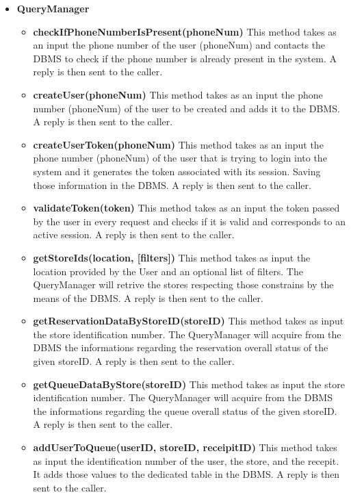 \begin{itemize}
    \item \textbf{QueryManager}
    \begin{itemize}
        \item \textbf{checkIfPhoneNumberIsPresent(phoneNum)}
        This method takes as an input the phone number of the user (phoneNum) and contacts the DBMS to check if the phone number is already present in the system. A reply is then sent to the caller.

        \item \textbf{createUser(phoneNum)}
        This method takes as an input the phone number (phoneNum) of the user to be created and adds it to the DBMS. A reply is then sent to the caller.

        \item \textbf{createUserToken(phoneNum)}
        This method takes as an input the phone number (phoneNum) of the user that is trying to login into the system and it generates the token associated with its session. Saving those information in the DBMS. A reply is then sent to the caller.

        \item \textbf{validateToken(token)}
        This method takes as an input the token passed by the user in every request and checks if it is valid and corresponds to an active session. A reply is then sent to the caller.

        \item \textbf{getStoreIds(location, [filters])}
        This method takes as input the location provided by the User and an optional list of filters. 
        The QueryManager will retrive the stores respecting those constrains by the means of the DBMS. A reply is then sent to the caller. 

        \item \textbf{getReservationDataByStoreID(storeID)}
        This method takes as input the store identification number. The QueryManager will acquire from the DBMS the informations regarding the reservation overall status of the given storeID. A reply is then sent to the caller.

        \item \textbf{getQueueDataByStore(storeID)}
        This method takes as input the store identification number. The QueryManager will acquire from the DBMS the informations regarding the queue overall status of the given storeID. A reply is then sent to the caller. 

        \item \textbf{addUserToQueue(userID, storeID, receipitID)}
        This method takes as input the identification number of the user, the store, and the recepit. 
        It adds those values to the dedicated table in the DBMS. A reply is then sent to the caller.


\end{itemize}
\end{itemize}
